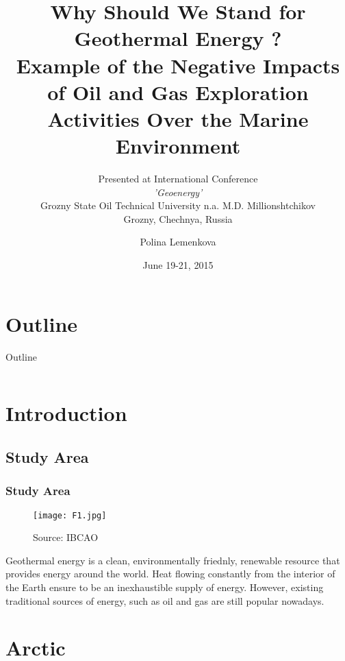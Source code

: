 \documentclass[pdflatex,compress,8pt,
	xcolor={dvipsnames,dvipsnames,svgnames,x11names,table},
	hyperref={	
	breaklinks = true, 
	pdfauthor={Lemenkova Polina}, 
	pdfsubject={Presentation}, 
	pdfcreator={Lemenkova Polina}, 
	pdfproducer={Lemenkova Polina}, 
	colorlinks=true,
	linkcolor=NavyBlue, 
	citecolor=NavyBlue, 
	urlcolor = NavyBlue, 
	breaklinks = true}]{beamer}
\title[Why Should We Stand for Geothermal Energy ? Grozny, Chechnya, Russia, June 19-21, 2015.]{Why Should We Stand for Geothermal Energy ?\\
 Example of the Negative Impacts of Oil and Gas Exploration Activities Over the Marine Environment}
\subtitle{\small{Presented at International Conference\\ \emph{'Geoenergy'}\\
Grozny State Oil Technical University n.a. M.D. Millionshtchikov\\
Grozny, Chechnya, Russia}}
\author[Polina Lemenkova]{Polina Lemenkova}
\date{June 19-21, 2015}
\begin{document}
\begin{frame}
           \titlepage
\end{frame}


\section*{Outline}
\begin{frame}{Outline}
    \begin{columns}[onlytextwidth,T]
        \begin{column}{.5\textwidth}
            \small{\tableofcontents[sections=1-4]}
        \end{column}
        \begin{column}{.5\textwidth}
            \small{\tableofcontents[sections=5-10]}
        \end{column}
    \end{columns}
\end{frame}

\section{Introduction}
\subsection{Study Area}
\begin{frame}\frametitle{Study Area}
\begin{figure}[H]
	\centering
		\texttt{[image: F1.jpg]}\caption{Source: IBCAO}
\end{figure}

\begin{alertblock}{}
Geothermal energy is a clean, environmentally friednly, renewable resource that provides energy around the world. Heat flowing constantly from the interior of the Earth ensure to be an inexhaustible supply of energy. However, existing traditional sources of energy, such as oil and gas are still popular nowadays.
\end{alertblock}

\end{frame}

\section{Arctic}
\end{document}
